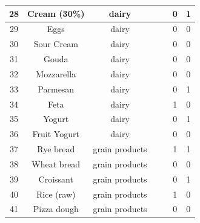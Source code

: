 \documentclass[
  letterpaper,
  DIV=11,
  numbers=noendperiod]{scrartcl}
\begin{document}
\begin{tabular}[t]{c|c|c|>{}c|>{}c|c|c}
\hline
28 & Cream (30\%) & dairy & \cellcolor[HTML]{433D84}{\textcolor{white}{5010}} & \cellcolor[HTML]{2C738E}{\textcolor{white}{292}} & 0 & 1\\
\hline
29 & Eggs & dairy & \cellcolor[HTML]{481F70}{\textcolor{white}{2540}} & \cellcolor[HTML]{443A83}{\textcolor{white}{137}} & 0 & 0\\
\hline
30 & Sour Cream & dairy & \cellcolor[HTML]{463480}{\textcolor{white}{4260}} & \cellcolor[HTML]{433E85}{\textcolor{white}{147}} & 0 & 0\\
\hline
31 & Gouda & dairy & \cellcolor[HTML]{228B8D}{\textcolor{white}{13090}} & \cellcolor[HTML]{228B8D}{\textcolor{white}{364}} & 0 & 0\\
\hline
32 & Mozzarella & dairy & \cellcolor[HTML]{38598C}{\textcolor{white}{7660}} & \cellcolor[HTML]{34618D}{\textcolor{white}{238}} & 0 & 0\\
\hline
33 & Parmesan & dairy & \cellcolor[HTML]{39568C}{\textcolor{white}{7410}} & \cellcolor[HTML]{218F8D}{\textcolor{white}{374}} & 0 & 1\\
\hline
34 & Feta & dairy & \cellcolor[HTML]{414287}{\textcolor{white}{5560}} & \cellcolor[HTML]{34608D}{\textcolor{white}{234}} & 1 & 0\\
\hline
35 & Yogurt & dairy & \cellcolor[HTML]{481467}{\textcolor{white}{1650}} & \cellcolor[HTML]{482071}{\textcolor{white}{78}} & 0 & 1\\
\hline
36 & Fruit Yogurt & dairy & \cellcolor[HTML]{471365}{\textcolor{white}{1560}} & \cellcolor[HTML]{472A7A}{\textcolor{white}{101}} & 0 & 0\\
\hline
37 & Rye bread & grain products & \cellcolor[HTML]{470E61}{\textcolor{white}{1210}} & \cellcolor[HTML]{38588C}{\textcolor{white}{212}} & 1 & 1\\
\hline
38 & Wheat bread & grain products & \cellcolor[HTML]{46075A}{\textcolor{white}{720}} & \cellcolor[HTML]{2C718E}{\textcolor{white}{285}} & 0 & 0\\
\hline
39 & Croissant & grain products & \cellcolor[HTML]{472A7A}{\textcolor{white}{3390}} & \cellcolor[HTML]{26818E}{\textcolor{white}{332}} & 0 & 1\\
\hline
40 & Rice (raw) & grain products & \cellcolor[HTML]{481B6D}{\textcolor{white}{2210}} & \cellcolor[HTML]{238A8D}{\textcolor{white}{361}} & 1 & 0\\
\hline
41 & Pizza dough & grain products & \cellcolor[HTML]{46075A}{\textcolor{white}{720}} & \cellcolor[HTML]{34608D}{\textcolor{white}{235}} & 0 & 0\\

\end{tabular}
\end{document}
